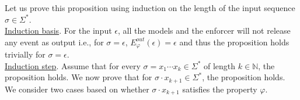Let us prove this proposition using induction on the length of the input sequence $\sigma \in \Sigma^{\ast}$.\\

\noindent \underline{Induction basis}. For the input $\epsilon$, all the models and the enforcer will not release any event as output i.e., for $\sigma = \epsilon$, $E_{\varphi}^{out}(\epsilon) = \epsilon$ and thus the proposition holds trivially for $\sigma = \epsilon$.\\

\noindent \underline{Induction step}. Assume that for every $\sigma = x_1 \cdots x_k \in \Sigma^{\ast}$ of length $k \in \mathbb{N}$, the proposition holds. We now prove that for $\sigma \cdot x_{k+1}\in \Sigma^{\ast}$, the proposition holds. We consider two cases based on whether $\sigma \cdot x_{k+1}$ satisfies the property $\varphi$.

